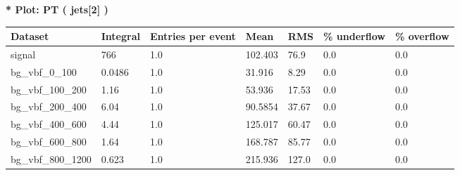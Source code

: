 \documentclass[a4paper, 10pt]{article}
\begin{document}
\textbf{* Plot: PT ( jets[2] ) }\\
   \begin{table}[H]
  \begin{center}
    \begin{tabular}{|m{23.0mm}|m{23.0mm}|m{18.0mm}|m{19.0mm}|m{19.0mm}|m{19.0mm}|m{19.0mm}|}
      \hline
      {\cellcolor{yellow}         Dataset}& {\cellcolor{yellow}         Integral}& {\cellcolor{yellow}         Entries per event}& {\cellcolor{yellow}         Mean}& {\cellcolor{yellow}         RMS}& {\cellcolor{yellow}         \% underflow}& {\cellcolor{yellow}         \% overflow}\\
      \hline
      {\cellcolor{white}         signal}& {\cellcolor{white}         766}& {\cellcolor{white}         1.0}& {\cellcolor{white}         102.403}& {\cellcolor{white}         76.9}& {\cellcolor{green}         0.0}& {\cellcolor{green}         0.0}\\
      \hline
      {\cellcolor{white}         bg\_vbf\_0\_100}& {\cellcolor{white}         0.0486}& {\cellcolor{white}         1.0}& {\cellcolor{white}         31.916}& {\cellcolor{white}         8.29}& {\cellcolor{green}         0.0}& {\cellcolor{green}         0.0}\\
      \hline
      {\cellcolor{white}         bg\_vbf\_100\_200}& {\cellcolor{white}         1.16}& {\cellcolor{white}         1.0}& {\cellcolor{white}         53.936}& {\cellcolor{white}         17.53}& {\cellcolor{green}         0.0}& {\cellcolor{green}         0.0}\\
      \hline
      {\cellcolor{white}         bg\_vbf\_200\_400}& {\cellcolor{white}         6.04}& {\cellcolor{white}         1.0}& {\cellcolor{white}         90.5854}& {\cellcolor{white}         37.67}& {\cellcolor{green}         0.0}& {\cellcolor{green}         0.0}\\
      \hline
      {\cellcolor{white}         bg\_vbf\_400\_600}& {\cellcolor{white}         4.44}& {\cellcolor{white}         1.0}& {\cellcolor{white}         125.017}& {\cellcolor{white}         60.47}& {\cellcolor{green}         0.0}& {\cellcolor{green}         0.0}\\
      \hline
      {\cellcolor{white}         bg\_vbf\_600\_800}& {\cellcolor{white}         1.64}& {\cellcolor{white}         1.0}& {\cellcolor{white}         168.787}& {\cellcolor{white}         85.77}& {\cellcolor{green}         0.0}& {\cellcolor{green}         0.0}\\
      \hline
      {\cellcolor{white}         bg\_vbf\_800\_1200}& {\cellcolor{white}         0.623}& {\cellcolor{white}         1.0}& {\cellcolor{white}         215.936}& {\cellcolor{white}         127.0}& {\cellcolor{green}         0.0}& {\cellcolor{green}         0.0}\\

\end{tabular}
\end{center}
\end{table}
\end{document}
